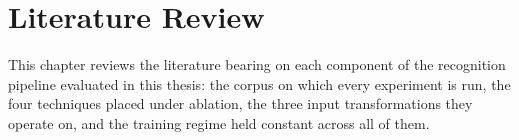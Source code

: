 %
%
%

\chapter{Literature Review}
\label{ch:literature}

This chapter reviews the literature bearing on each component of the recognition pipeline evaluated in this thesis: the corpus on which every experiment is run, the four techniques placed under ablation, the three input transformations they operate on, and the training regime held constant across all of them.

